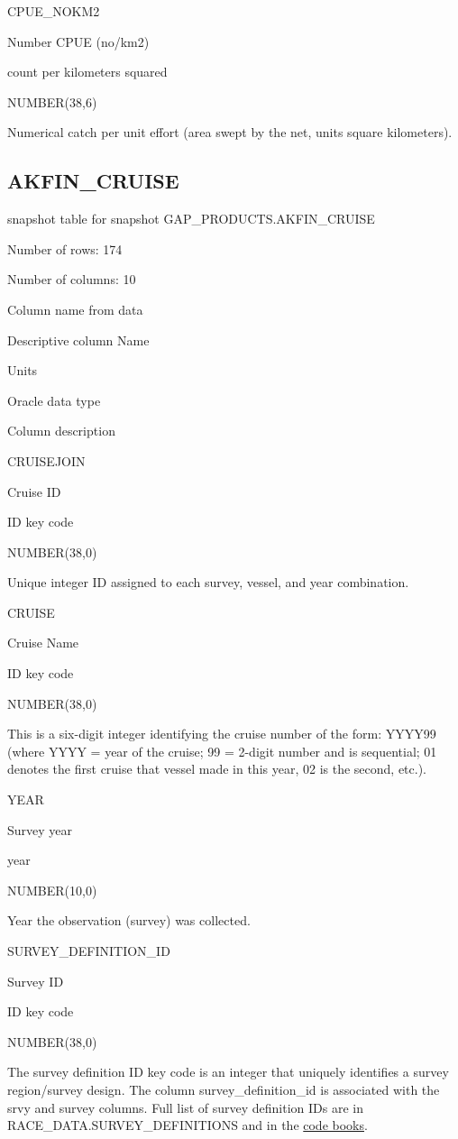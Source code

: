 \documentclass[
  letterpaper,
  oneside,
  open=any]{scrbook}
\begin{document}
CPUE\_NOKM2

Number CPUE (no/km2)

count per kilometers squared

NUMBER(38,6)

Numerical catch per unit effort (area swept by the net, units square
kilometers).

\subsection{AKFIN\_CRUISE}\label{akfin_cruise}

snapshot table for snapshot GAP\_PRODUCTS.AKFIN\_CRUISE

Number of rows: 174

Number of columns: 10

Column name from data

Descriptive column Name

Units

Oracle data type

Column description

CRUISEJOIN

Cruise ID

ID key code

NUMBER(38,0)

Unique integer ID assigned to each survey, vessel, and year combination.

CRUISE

Cruise Name

ID key code

NUMBER(38,0)

This is a six-digit integer identifying the cruise number of the form:
YYYY99 (where YYYY = year of the cruise; 99 = 2-digit number and is
sequential; 01 denotes the first cruise that vessel made in this year,
02 is the second, etc.).

YEAR

Survey year

year

NUMBER(10,0)

Year the observation (survey) was collected.

SURVEY\_DEFINITION\_ID

Survey ID

ID key code

NUMBER(38,0)

The survey definition ID key code is an integer that uniquely identifies
a survey region/survey design. The column survey\_definition\_id is
associated with the srvy and survey columns. Full list of survey
definition IDs are in RACE\_DATA.SURVEY\_DEFINITIONS and in the
\href{https://www.fisheries.noaa.gov/resource/document/groundfish-survey-species-code-manual-and-data-codes-manual}{code
books}.
\end{document}
